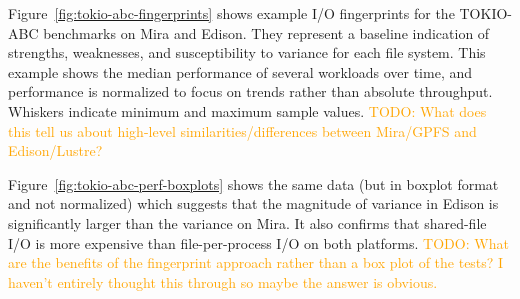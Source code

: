 \documentclass[conference,10pt,compsocconf]{IEEEtran}
\newcommand{\todo}[1]{\textcolor{Orange}{TODO: #1}}
\begin{document}
Figure~\ref{fig:tokio-abc-fingerprints} shows example I/O fingerprints for the
TOKIO-ABC benchmarks on Mira and Edison.  They represent a baseline indication
of strengths, weaknesses, and susceptibility to variance for each file system.
This example shows the median performance of several workloads over time, and
performance is normalized to focus on trends rather than absolute throughput.
Whiskers indicate minimum and maximum sample values. \todo{What does this tell
us about high-level similarities/differences between Mira/GPFS and
Edison/Lustre?}

Figure~\ref{fig:tokio-abc-perf-boxplots} shows the same data (but in boxplot
format and not normalized) which suggests that the magnitude of variance in
Edison is significantly larger than the variance on Mira.  It also confirms that
shared-file I/O is more expensive than file-per-process I/O on both platforms.
\todo{What are the benefits of the fingerprint approach rather than a box plot
of the tests?  I haven't entirely thought this through so maybe the answer is
obvious.}
\end{document}

